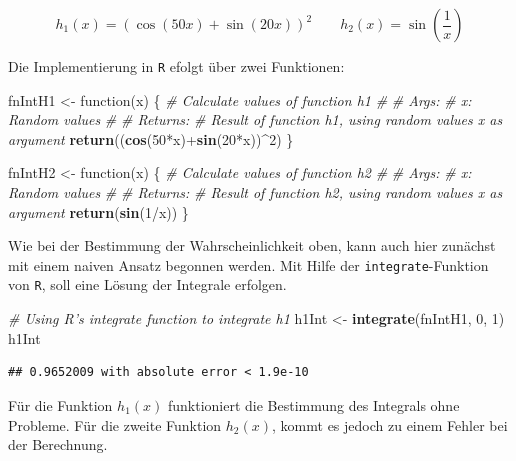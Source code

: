 \documentclass[10pt,]{article}
\newenvironment{Shaded}{\begin{snugshade}}{\end{snugshade}}
\newcommand{\KeywordTok}[1]{\textcolor[rgb]{0.13,0.29,0.53}{\textbf{{#1}}}}
\newcommand{\DecValTok}[1]{\textcolor[rgb]{0.00,0.00,0.81}{{#1}}}
\newcommand{\StringTok}[1]{\textcolor[rgb]{0.31,0.60,0.02}{{#1}}}
\newcommand{\CommentTok}[1]{\textcolor[rgb]{0.56,0.35,0.01}{\textit{{#1}}}}
\newcommand{\NormalTok}[1]{{#1}}
\begin{document}
\begin{equation*}
h_1(x) = (\cos(50x) + \sin(20x))^2 \qquad h_2(x) = \sin(\frac{1}{x})
\end{equation*}

Die Implementierung in \texttt{R} efolgt über zwei Funktionen:

\begin{Shaded}
\begin{Highlighting}[]
\NormalTok{fnIntH1 <-}\StringTok{ }\NormalTok{function(x) \{}
  \CommentTok{# Calculate values of function h1}
  \CommentTok{# }
  \CommentTok{# Args:}
  \CommentTok{#   x: Random values}
  \CommentTok{#   }
  \CommentTok{# Returns:}
  \CommentTok{#   Result of function h1, using random values x as argument}
  \KeywordTok{return}\NormalTok{((}\KeywordTok{cos}\NormalTok{(}\DecValTok{50}\NormalTok{*x)+}\KeywordTok{sin}\NormalTok{(}\DecValTok{20}\NormalTok{*x))^}\DecValTok{2}\NormalTok{)}
\NormalTok{\}}

\NormalTok{fnIntH2 <-}\StringTok{ }\NormalTok{function(x) \{}
  \CommentTok{# Calculate values of function h2}
  \CommentTok{# }
  \CommentTok{# Args:}
  \CommentTok{#   x: Random values}
  \CommentTok{#   }
  \CommentTok{# Returns:}
  \CommentTok{#   Result of function h2, using random values x as argument}
  \KeywordTok{return}\NormalTok{(}\KeywordTok{sin}\NormalTok{(}\DecValTok{1}\NormalTok{/x))}
\NormalTok{\}}
\end{Highlighting}
\end{Shaded}

Wie bei der Bestimmung der Wahrscheinlichkeit oben, kann auch hier
zunächst mit einem naiven Ansatz begonnen werden. Mit Hilfe der
\texttt{integrate}-Funktion von \texttt{R}, soll eine Lösung der
Integrale erfolgen.

\begin{Shaded}
\begin{Highlighting}[]
\CommentTok{# Using R's integrate function to integrate h1}
\NormalTok{h1Int <-}\StringTok{ }\KeywordTok{integrate}\NormalTok{(fnIntH1, }\DecValTok{0}\NormalTok{, }\DecValTok{1}\NormalTok{)}
\NormalTok{h1Int}
\end{Highlighting}
\end{Shaded}

\begin{verbatim}
## 0.9652009 with absolute error < 1.9e-10
\end{verbatim}

Für die Funktion \(h_1(x)\) funktioniert die Bestimmung des Integrals
ohne Probleme. Für die zweite Funktion \(h_2(x)\), kommt es jedoch zu
einem Fehler bei der Berechnung.
\end{document}
